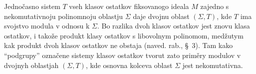 \documentclass[11pt]{article}
\begin{document}
Jednočasno sistem \(T\) vseh klasov ostatkov fiksovanogo ideala \(M\) zajedno s nekomutativnoju polinomnoju oblastju \(\Sigma\) daje dvojnu oblast \((\Sigma,T)\), kde \(T\) ima svojstvo modula v odnosu k \(\Sigma\). Bo razlika dvoh klasov ostatkov jest znovu klasa ostatkov, i takože produkt klasy ostatkov s libovolnym polinomom, medžutym kak produkt dvoh klasov ostatkov ne obstaja (naved. rab., \S~3). Tam kako ``podgrupy'' označene sistemy klasov ostatkov tvorut zato priměry modulov v dvojnyh oblastjah \((\Sigma,T)\), kde osnovna kolceva oblast \(\Sigma\) jest nekomutativna.
\end{document}
